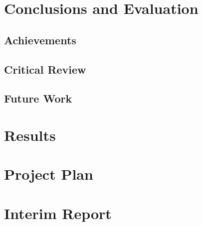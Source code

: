 \documentclass[12pt,leqno]{report}
\begin{document}
\chapter{Conclusions and Evaluation}
\section{Achievements}
\section{Critical Review}
\section{Future Work}

\appendix
\chapter{Results}
\chapter{Project Plan}
\chapter{Interim Report}
\end{document}
